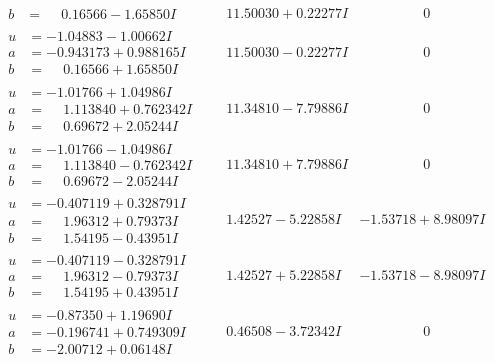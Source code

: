 \documentclass[1p]{elsarticle_modified}
\theoremstyle{definition}
\begin{document}
$$\begin{array}{c|c|c}
\begin{aligned}
b &= \phantom{-}0.16566 - 1.65850 I\end{aligned}
 & \phantom{-}11.50030 + 0.22277 I & \phantom{-0.000000 } 0 \\ \hline\begin{aligned}
u &= -1.04883 - 1.00662 I \\
a &= -0.943173 + 0.988165 I \\
b &= \phantom{-}0.16566 + 1.65850 I\end{aligned}
 & \phantom{-}11.50030 - 0.22277 I & \phantom{-0.000000 } 0 \\ \hline\begin{aligned}
u &= -1.01766 + 1.04986 I \\
a &= \phantom{-}1.113840 + 0.762342 I \\
b &= \phantom{-}0.69672 + 2.05244 I\end{aligned}
 & \phantom{-}11.34810 - 7.79886 I & \phantom{-0.000000 } 0 \\ \hline\begin{aligned}
u &= -1.01766 - 1.04986 I \\
a &= \phantom{-}1.113840 - 0.762342 I \\
b &= \phantom{-}0.69672 - 2.05244 I\end{aligned}
 & \phantom{-}11.34810 + 7.79886 I & \phantom{-0.000000 } 0 \\ \hline\begin{aligned}
u &= -0.407119 + 0.328791 I \\
a &= \phantom{-}1.96312 + 0.79373 I \\
b &= \phantom{-}1.54195 - 0.43951 I\end{aligned}
 & \phantom{-}1.42527 - 5.22858 I & -1.53718 + 8.98097 I \\ \hline\begin{aligned}
u &= -0.407119 - 0.328791 I \\
a &= \phantom{-}1.96312 - 0.79373 I \\
b &= \phantom{-}1.54195 + 0.43951 I\end{aligned}
 & \phantom{-}1.42527 + 5.22858 I & -1.53718 - 8.98097 I \\ \hline\begin{aligned}
u &= -0.87350 + 1.19690 I \\
a &= -0.196741 + 0.749309 I \\
b &= -2.00712 + 0.06148 I\end{aligned}
 & \phantom{-}0.46508 - 3.72342 I & \phantom{-0.000000 } 0 \\ \hline\begin{aligned}

\end{aligned}
\end{array}$$
\end{document}
